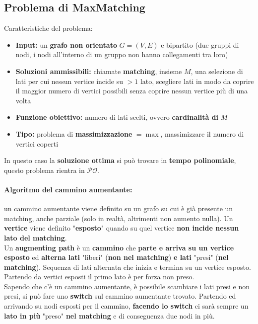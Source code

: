 \newpage


\subsection{Problema di MaxMatching} 
Caratteristiche del problema: 
\begin{itemize}
	\item \textbf{Input:} un \textbf{grafo non orientato} $G = (V, E)$ e bipartito (due gruppi di nodi, i nodi all'interno di un gruppo non hanno collegamenti tra loro)
	\item \textbf{Soluzioni ammissibili:} chiamate \textbf{matching}, insieme $M$, una selezione di lati per cui nessun vertice incide su $>1$ lato, scegliere lati in modo da coprire il maggior numero di vertici possibili senza coprire nessun vertice più di una volta
	
	\item \textbf{Funzione obiettivo:} numero di lati scelti, ovvero \textbf{cardinalità di} $M$
	
	\item \textbf{Tipo:} problema di \textbf{massimizzazione} $= \max$, massimizzare il numero di vertici coperti
\end{itemize}

In questo caso la \textbf{soluzione ottima} si può trovare in \textbf{tempo polinomiale}, questo problema rientra in $\mathcal{PO}$. \\

\paragraph{Algoritmo del cammino aumentante:} un cammino aumentante viene definito su un grafo su cui è già presente un matching, anche parziale (solo in realtà, altrimenti non aumento nulla). Un \textbf{vertice} viene definito "\textbf{esposto}" quando su quel vertice \textbf{non incide nessun lato del matching}. \\

Un \textbf{augmenting path} è un \textbf{cammino} che \textbf{parte e arriva su un vertice esposto} ed \textbf{alterna lati} "liberi" (\textbf{non nel matching}) \textbf{e lati} "presi" (\textbf{nel matching}). Sequenza di lati alternata che inizia e termina su un vertice esposto. Partendo da vertici esposti il primo lato è per forza non preso.\\

Sapendo che c'è un cammino aumentante, è possibile scambiare i lati presi e non presi, si può fare uno \textbf{switch} sul cammino aumentante trovato. Partendo ed arrivando su nodi esposti per il cammino, \textbf{facendo lo switch} ci sarà sempre un \textbf{lato in più} "preso" \textbf{nel matching} e di conseguenza due nodi in più.\\

